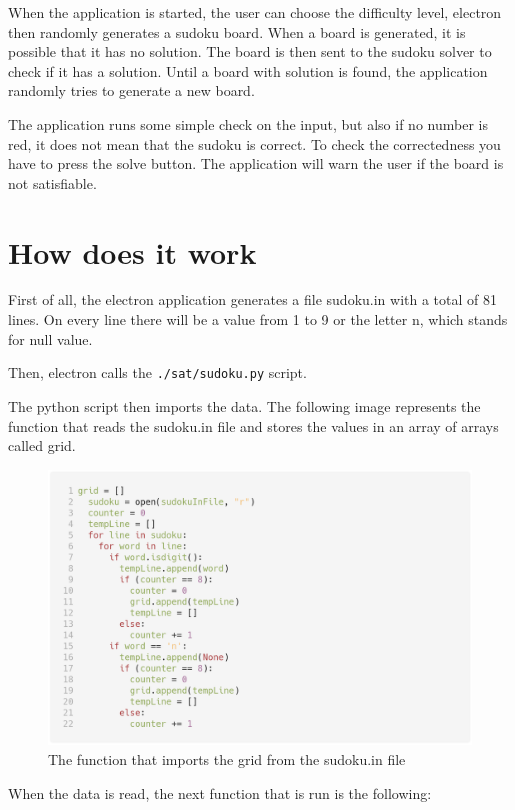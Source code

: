 \documentclass[10pt]{article}
\begin{document}
When the application is started, the user can choose the difficulty level, electron then
randomly generates a sudoku board. When a board is generated, it is possible that
it has no solution. The board is then sent to the sudoku solver to check
if it has a solution. Until a board with solution is found, the application
randomly tries to generate a new board.

The application runs some simple check on the input, but also if
no number is red, it does not mean that the sudoku is correct. To check the correctedness
you have to press the solve button.
The application will warn the user if the board is not satisfiable.

\section*{How does it work}
First of all, the electron application generates a file sudoku.in with a total of
81 lines. On every line there will be a value from 1 to 9 or the letter n, which stands
for null value.

Then, electron calls the \texttt{./sat/sudoku.py} script.

The python script then imports the data. The following image represents the function that reads the sudoku.in
file and stores the values in an array of arrays called grid.

\begin{figure}[h!]
  \centering
  \includegraphics[width=\textwidth]{readFile.png}
  \caption{The function that imports the grid from the sudoku.in file}
\end{figure}
\clearpage

When the data is read, the next function that is run is the following:
\end{document}
